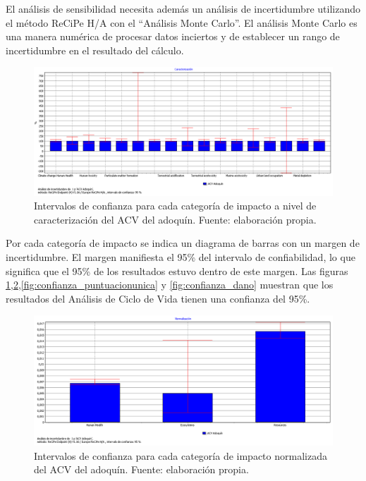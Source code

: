El análisis de sensibilidad necesita además un análisis de incertidumbre utilizando el método ReCiPe H/A con el ``Análisis Monte Carlo''. El análisis Monte Carlo es una manera numérica de procesar datos inciertos y de establecer un rango de incertidumbre en el resultado del cálculo.

\begin{figure}[!htb]
\centering
\includegraphics[width=15cm]{img/confianza_caracterizacion.png}
\caption[Intervalos de confianza para cada categoría de impacto a nivel de caracterización del ACV del adoquín.]{Intervalos de confianza para cada categoría de impacto a nivel de caracterización del ACV del adoquín. Fuente: elaboración propia.}
\label{fig:confianza_caracterizacion}
\end{figure}

Por cada categoría de impacto se indica un diagrama de barras con un margen de incertidumbre. El margen manifiesta el 95\% del intervalo de confiabilidad, lo que significa que el 95\% de los resultados estuvo dentro de este margen. Las figuras \ref{fig:confianza_caracterizacion},\ref{fig:confianza_normalizacion},\ref{fig:confianza_puntuacionunica} y \ref{fig:confianza_dano} muestran que los resultados del Análisis de Ciclo de Vida tienen una confianza del 95\%.

\begin{figure}[!htb]
\centering
\includegraphics[width=15cm]{img/confianza_normalizacion.png}
\caption[Intervalos de confianza para cada categoría de impacto normalizada del ACV del adoquín.]{Intervalos de confianza para cada categoría de impacto normalizada del ACV del adoquín. Fuente: elaboración propia.}
\label{fig:confianza_normalizacion}
\end{figure}

